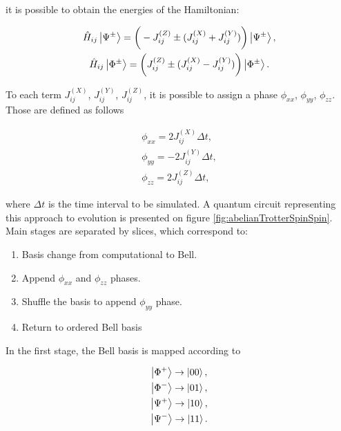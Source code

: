       \noindent it is possible to obtain the energies of the Hamiltonian:

      \begin{gather}
        \hat{H}_{ij} \ket{\Psi^{\pm}} = \bigg(-J_{ij}^{(Z)} \pm (J_{ij}^{(X)} + J_{ij}^{(Y)})\bigg) \ket{\Psi^{\pm}}, \\
        \hat{H}_{ij} \ket{\Phi^{\pm}} = \bigg(J_{ij}^{(Z)} \pm (J_{ij}^{(X)} - J_{ij}^{(Y)})\bigg) \ket{\Phi^{\pm}}.
        \label{eq:SpinSpinEnergies}
      \end{gather}

      To each term $J_{ij}^{(X)}$, $J_{ij}^{(Y)}$, $J_{ij}^{(Z)}$, it is possible to assign a phase $\phi_{xx}$, $\phi_{yy}$, $\phi_{zz}$. Those are defined as follows

      \begin{gather}
        \phi_{xx} = 2 J_{ij}^{(X)} \Delta t, \\
        \phi_{yy} = -2 J_{ij}^{(Y)} \Delta t, \\
        \phi_{zz} = 2 J_{ij}^{(Z)} \Delta t,
        \label{eq:SpinSpinPhases}
      \end{gather}
      
      \noindent where $\Delta t$ is the time interval to be simulated. A quantum circuit representing this approach to evolution is presented on figure \ref{fig:abelianTrotterSpinSpin}. Main stages are separated by slices, which correspond to:

      \begin{enumerate}
        \item Basis change from computational to Bell.
        \item Append $\phi_{xx}$ and $\phi_{zz}$ phases.
        \item Shuffle the basis to append $\phi_{yy}$ phase.
        \item Return to ordered Bell basis
      \end{enumerate}

      In the first stage, the Bell basis is mapped according to

      \begin{gather}
        \ket{\Phi^{+}} \rightarrow \ket{00}, \\
        \ket{\Phi^{-}} \rightarrow \ket{01}, \\
        \ket{\Psi^{+}} \rightarrow \ket{10}, \\
        \ket{\Psi^{-}} \rightarrow \ket{11}. 
      \end{gather}

